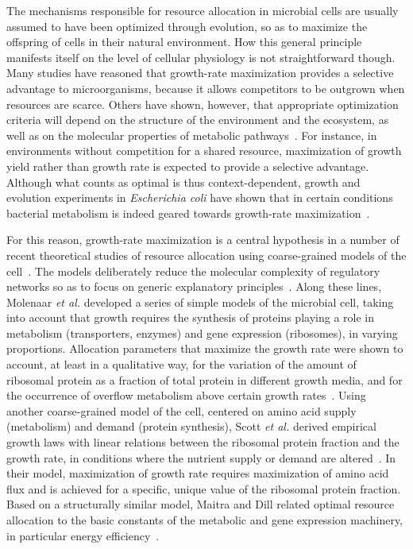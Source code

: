 The mechanisms responsible for resource allocation in microbial cells are usually assumed to have been optimized through evolution, so as to maximize the offspring of cells in their natural environment.
How this general principle manifests itself on the level of cellular physiology is not straightforward though.
Many studies have reasoned that growth-rate maximization provides a selective advantage to microorganisms, because it allows competitors to be outgrown when resources are scarce.
Others have shown, however, that appropriate optimization criteria will depend on the structure of the environment and the ecosystem, as well as on the molecular properties of metabolic pathways~\cite{frank_tradeoff_2010,maclean_tragedy_2008,schuetz_multidimensional_2012,schuster_maximization_2008,schuetz_systematic_2007}.
For instance,  in environments without competition for a shared resource, maximization of growth yield rather than growth rate is expected to provide a selective advantage.
Although what counts as optimal is thus context-dependent, growth and evolution experiments in \textit{Escherichia coli} have shown that in certain conditions bacterial metabolism is indeed geared towards growth-rate maximization~\cite{edwards_silico_2001,ibarra_escherichia_2002,lewis_omic_2010}.

For this reason, growth-rate maximization is a central hypothesis in a number of recent theoretical studies of resource allocation using coarse-\linebreak grained mod\-els of the cell~\cite{molenaar_shifts_2009,scott_interdependence_2010,scott_emergence_2014}.
The models deliberately reduce the molecular complexity of regulatory networks so as to focus on generic explanatory principles~\cite{servedio_not_2014}.
Along these lines, Molenaar \textit{et al.} developed a series of simple models of the microbial cell, taking into account that growth requires the synthesis of proteins playing a role in metabolism (transporters, enzymes) and gene expression (ribosomes), in varying proportions.
Allocation parameters that maximize the growth rate were shown to account, at least in a qualitative way, for the variation of the amount of ribosomal protein as a fraction of total protein in different growth media, and for the occurrence of overflow metabolism above certain growth rates~\cite{molenaar_shifts_2009}.
Using another coarse-grained model of the cell, centered on amino acid supply (metabolism) and demand (protein synthesis), Scott \textit{et al.} derived empirical growth laws with linear relations between the ribosomal protein fraction and the growth rate, in conditions where the nutrient supply or demand are altered~\cite{scott_interdependence_2010,scott_emergence_2014}.
In their model, maximization of growth rate requires maximization of amino acid flux and is achieved for a specific, unique value of the ribosomal protein fraction.
Based on a structurally similar model, Maitra and Dill related optimal resource allocation to the basic constants of the metabolic and gene expression machinery, in particular energy efficiency~\cite{maitra_bacterial_2014}.

